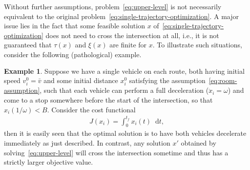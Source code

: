 \documentclass[a4paper]{report}
\theoremstyle{definition}
\newtheorem{eg}{Example}[chapter]
\theoremstyle{plain}
\newcommand*\diff{\mathop{}\!\mathrm{d}}
\begin{document}
Without further assumptions, problem~\eqref{eq:upper-level} is not necessarily
equivalent to the original problem~\eqref{eq:single-trajectory-optimization}.
%
A major issue lies in the fact that some feasible solution $x$ of~\eqref{eq:single-trajectory-optimization} does not
need to cross the intersection at all, i.e., it is not guaranteed that $\tau(x)$
and $\xi(x)$ are finite for $x$.
%
To illustrate such situations, consider the following (pathological) example.
\begin{eg}
  Suppose we have a single vehicle on each route, both having initial speed
  $v_{i}^{0} = \bar{v}$ and some initial distance $x_{i}^{0}$ satisfying the
  assumption~\eqref{eq:room-assumption}, such that each vehicle can perform a
  full deceleration ($\ddot{x}_{i} = \omega$) and come to a stop somewhere
  before the start of the intersection, so that $x_{i}(1/\omega) < B$. Consider
  the cost functional
  \begin{align}
    J(x_{i}) = \int_{0}^{t_{f}} x_{i}(t) \diff t ,
  \end{align}
  then it is easily seen that the optimal solution is to have both vehicles
  decelerate immediately as just described.
  In contrast, any solution $x'$ obtained by solving~\eqref{eq:upper-level} will
  cross the intersection sometime and thus has a strictly larger objective
  value.
\end{eg}
\end{document}
